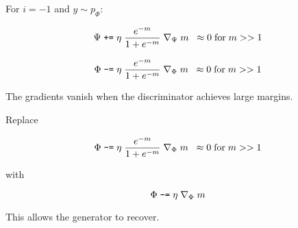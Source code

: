 {\vfill
For $i = -1$ and $y \sim p_\Phi$:

$$\Psi \;\mbox{\tt +=} \; \eta\;\frac{e^{-m}}{1 + e^{-m}}\;\nabla_\Psi\;m \;\;\approx 0 \;\mbox{for}\;m >> 1$$

\vfill
$$\Phi \;\mbox{\tt -=} \; \eta\;\frac{e^{-m}}{1 + e^{-m}}\;\nabla_\Phi\;m \;\;\approx 0 \;\mbox{for}\;m >> 1$$

\vfill
The gradients vanish when the discriminator achieves large margins.


Replace

$$\Phi \;\mbox{\tt -=} \; \eta\;\frac{e^{-m}}{1 + e^{-m}}\;\nabla_\Phi\; m \;\;\approx 0 \;\mbox{for}\;m >> 1$$

\vfill
with

$$\Phi \;\mbox{\tt -=} \; \eta\;\nabla_\Phi\;m$$

\vfill
This allows the generator to recover.


}

